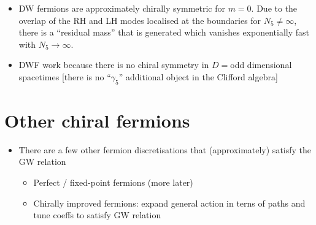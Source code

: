 \begin{itemize}
    \item DW fermions are approximately chirally symmetric for $m = 0$. Due to the overlap of the RH and LH modes localised at the boundaries for $N_5 \neq \infty$, there is a ``residual mass'' that is generated which vanishes exponentially fast with $N_5 \rightarrow \infty$.
    \item DWF work because there is no chiral symmetry in $D = $odd dimensional spacetimes [there is no ``$\gamma_5$'' additional object in the Clifford algebra]
\end{itemize}

\section{Other chiral fermions}
\begin{itemize}
  \item There are a few other fermion discretisations that (approximately) satisfy the GW relation
  \begin{itemize}
  \item Perfect / fixed-point fermions (more later)
  \item Chirally improved fermions: expand general action in terns of paths and tune coeffs to satisfy GW relation
  \end{itemize}
\end{itemize}
